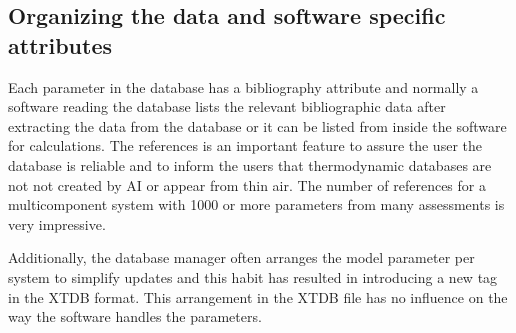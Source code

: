 \documentclass{article}
\begin{document}
\subsection{Organizing the data and software specific attributes}\label{sec:subsys}\label{sec:soft}\label{sec:last}

Each parameter in the database has a bibliography attribute and
normally a software reading the database lists the relevant
bibliographic data after extracting the data from the database or it
can be listed from inside the software for calculations.  The
references is an important feature to assure the user the database is
reliable and to inform the users that thermodynamic databases are not
not created by AI or appear from thin air.  The number of references
for a multicomponent system with 1000 or more parameters from many
assessments is very impressive.

Additionally, the database manager often arranges the model parameter
per system to simplify updates and this habit has resulted in
introducing a new tag in the XTDB format.  This arrangement in the
XTDB file has no influence on the way the software handles the
parameters.
\end{document}
